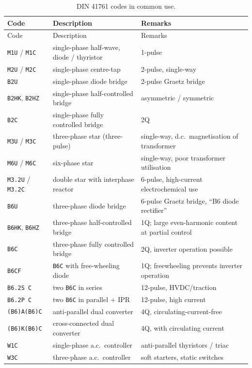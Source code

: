 \documentclass[11pt,a4paper]{article}
\newcommand{\code}[1]{\texttt{#1}}
\begin{document}
\begin{longtable}{lp{5.2cm}p{5.5cm}}
\caption{DIN 41761 codes in common use.}\\
\toprule
Code & Description & Remarks \\
\midrule
\endfirsthead
\toprule
Code & Description & Remarks \\
\midrule
\endhead
\code{M1U} / \code{M1C} & single-phase half-wave, diode / thyristor & 1-pulse \\
\code{M2U} / \code{M2C} & single-phase centre-tap & 2-pulse, single-way \\
\code{B2U} & single-phase diode bridge & 2-pulse Graetz bridge \\
\code{B2HK}, \code{B2HZ} & single-phase half-controlled bridge & asymmetric / symmetric \\
\code{B2C} & single-phase fully controlled bridge & 2Q \\
\code{M3U} / \code{M3C} & three-phase star (three-pulse) & single-way, d.c.\ magnetisation of transformer \\
\code{M6U} / \code{M6C} & six-phase star & single-way, poor transformer utilisation \\
\code{M3.2U} / \code{M3.2C} & double star with interphase reactor & 6-pulse, high-current electrochemical use \\
\code{B6U} & three-phase diode bridge & 6-pulse Graetz bridge, ``B6 diode rectifier'' \\
\code{B6HK}, \code{B6HZ} & three-phase half-controlled bridge & 1Q; large even-harmonic content at partial control \\
\code{B6C} & three-phase fully controlled bridge & 2Q, inverter operation possible \\
\code{B6CF} & \code{B6C} with free-wheeling diode & 1Q; freewheeling prevents inverter operation \\
\code{B6.2S C} & two \code{B6C} in series & 12-pulse, HVDC/traction \\
\code{B6.2P C} & two \code{B6C} in parallel + IPR & 12-pulse, high current \\
\code{(B6)A(B6)C} & anti-parallel dual converter & 4Q, circulating-current-free \\
\code{(B6)K(B6)C} & cross-connected dual converter & 4Q, with circulating current \\
\code{W1C} & single-phase a.c.\ controller & anti-parallel thyristors / triac \\
\code{W3C} & three-phase a.c.\ controller & soft starters, static switches \\
\bottomrule
\end{longtable}
\end{document}
